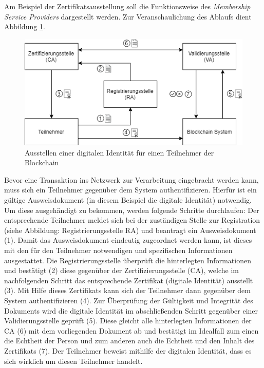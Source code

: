 \noindent
Am Beispiel der Zertifikatsausstellung soll die Funktionsweise des \textit{Membership Service Providers} dargestellt werden. Zur Veranschaulichung des Ablaufs dient Abbildung \ref{fig:hyperledger-fabric-membership-blockchain}.

\begin{figure}[H]
	\centering
	\includegraphics[width=1\linewidth]{pictures/digital-identity-issue}
	\caption[Ausstellen einer digitalen Identität für einen Teilnehmer der Blockchain]{Ausstellen einer digitalen Identität für einen Teilnehmer der Blockchain}
	\label{fig:hyperledger-fabric-membership-blockchain}
\end{figure}

\noindent
Bevor eine Transaktion ins Netzwerk zur Verarbeitung eingebracht werden kann, muss sich ein Teilnehmer gegenüber dem System authentifizieren. Hierfür ist ein gültige Ausweisdokument (in diesem Beispiel die digitale Identität) notwendig. Um diese ausgehändigt zu bekommen, werden folgende Schritte durchlaufen: Der entsprechende Teilnehmer meldet sich bei der zuständigen Stelle zur Registration (siehe Abbildung: Registrierungsstelle RA) und beantragt ein Ausweisdokument (1). Damit das Ausweisdokument eindeutig zugeordnet werden kann, ist dieses mit den für den Teilnehmer notwendigen und spezifischen Informationen ausgestattet. Die Registrierungsstelle überprüft die hinterlegten Informationen und bestätigt (2) diese gegenüber der Zertifizierungsstelle (CA), welche im nachfolgenden Schritt das entsprechende Zertifikat (digitale Identität) ausstellt (3). Mit Hilfe dieses Zertifikats kann sich der Teilnehmer dann gegenüber dem System authentifizieren (4). Zur Überprüfung der Gültigkeit und Integrität des Dokuments wird die digitale Identität im abschließenden Schritt gegenüber einer Validierungsstelle geprüft (5). Diese gleicht alle hinterlegten Informationen der CA (6) mit dem vorliegenden Dokument ab und bestätigt im Idealfall zum einen die Echtheit der Person und zum anderen auch die Echtheit und den Inhalt des Zertifikats (7). Der Teilnehmer beweist mithilfe der digitalen Identität, dass es sich wirklich um diesen Teilnehmer handelt.

